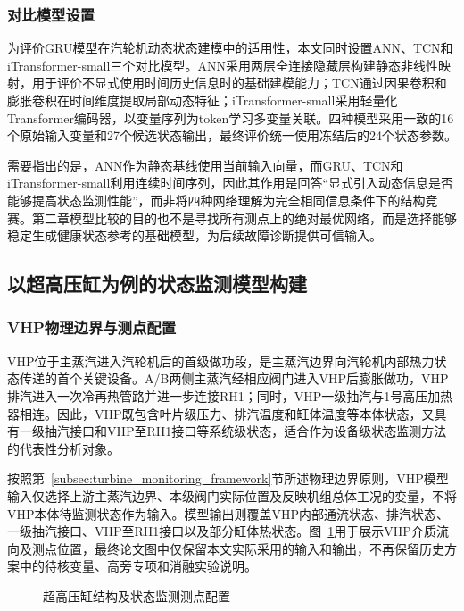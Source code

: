 \subsubsection{对比模型设置}

为评价GRU模型在汽轮机动态状态建模中的适用性，本文同时设置ANN、TCN和iTransformer-small三个对比模型。ANN采用两层全连接隐藏层构建静态非线性映射，用于评价不显式使用时间历史信息时的基础建模能力；TCN通过因果卷积和膨胀卷积在时间维度提取局部动态特征\cite{Bai2018TCN}；iTransformer-small采用轻量化Transformer编码器，以变量序列为token学习多变量关联\cite{Liu2024iTransformer}。四种模型采用一致的16个原始输入变量和27个候选状态输出，最终评价统一使用冻结后的24个状态参数。

需要指出的是，ANN作为静态基线使用当前输入向量，而GRU、TCN和iTransformer-small利用连续时间序列，因此其作用是回答“显式引入动态信息是否能够提高状态监测性能”，而非将四种网络理解为完全相同信息条件下的结构竞赛。第二章模型比较的目的也不是寻找所有测点上的绝对最优网络，而是选择能够稳定生成健康状态参考的基础模型，为后续故障诊断提供可信输入。

\subsection{以超高压缸为例的状态监测模型构建}
\label{subsec:vhp_case}

\subsubsection{VHP物理边界与测点配置}

VHP位于主蒸汽进入汽轮机后的首级做功段，是主蒸汽边界向汽轮机内部热力状态传递的首个关键设备。A/B两侧主蒸汽经相应阀门进入VHP后膨胀做功，VHP排汽进入一次冷再热管路并进一步连接RH1；同时，VHP一级抽汽与1号高压加热器相连。因此，VHP既包含叶片级压力、排汽温度和缸体温度等本体状态，又具有一级抽汽接口和VHP至RH1接口等系统级状态，适合作为设备级状态监测方法的代表性分析对象。

按照第~\ref{subsec:turbine_monitoring_framework}节所述物理边界原则，VHP模型输入仅选择上游主蒸汽边界、本级阀门实际位置及反映机组总体工况的变量，不将VHP本体待监测状态作为输入。模型输出则覆盖VHP内部通流状态、排汽状态、一级抽汽接口、VHP至RH1接口以及部分缸体热状态。图~\ref{fig:vhp_io}用于展示VHP介质流向及测点位置，最终论文图中仅保留本文实际采用的输入和输出，不再保留历史方案中的待核变量、高旁专项和消融实验说明。

\begin{figure}[htbp]
    \centering
    \caption{超高压缸结构及状态监测测点配置}
    \label{fig:vhp_io}
\end{figure}

